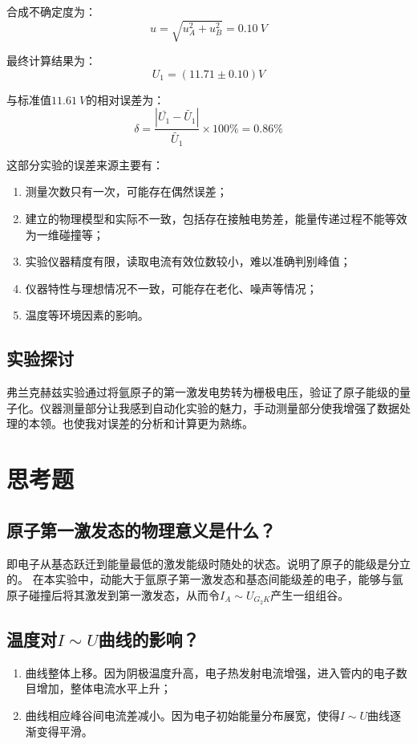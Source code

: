 \documentclass[]{../../templates/Report}%
\begin{document}
\begin{fullreportonly}
合成不确定度为：
\[u = \sqrt{u_A^2 + u_B^2} = \SI{0.10}{V}\]

最终计算结果为：
\[U_1 = (11.71 \pm 0.10)\si{V}\]

与标准值$\SI{11.61}{V}$的相对误差为：
\[\delta = \frac{\left|\bar{U_1} - \tilde{U_1}\right|}{\tilde{U_1}} \times 100 \% = 0.86\%\]

这部分实验的误差来源主要有：
\begin{enumerate}
    \item 测量次数只有一次，可能存在偶然误差；
    \item 建立的物理模型和实际不一致，包括存在接触电势差，能量传递过程不能等效为一维碰撞等；
    \item 实验仪器精度有限，读取电流有效位数较小，难以准确判别峰值；
    \item 仪器特性与理想情况不一致，可能存在老化、噪声等情况；
    \item 温度等环境因素的影响。
\end{enumerate}

\subsection{实验探讨}

弗兰克赫兹实验通过将氩原子的第一激发电势转为栅极电压，验证了原子能级的量子化。仪器测量部分让我感到自动化实验的魅力，手动测量部分使我增强了数据处理的本领。也使我对误差的分析和计算更为熟练。

\section{思考题}
\subsection{原子第一激发态的物理意义是什么？}
即电子从基态跃迁到能量最低的激发能级时随处的状态。说明了原子的能级是分立的。
在本实验中，动能大于氩原子第一激发态和基态间能级差的电子，能够与氩原子碰撞后将其激发到第一激发态，从而令$I_A \sim U_{G_2K}$产生一组组谷。

\subsection{温度对$I \sim U $曲线的影响？}
\begin{enumerate}
    \item 曲线整体上移。因为阴极温度升高，电子热发射电流增强，进入管内的电子数目增加，整体电流水平上升；
    \item 曲线相应峰谷间电流差减小。因为电子初始能量分布展宽，使得$I \sim U$曲线逐渐变得平滑。
\end{enumerate}
\end{fullreportonly}
\insertnotes
\end{document}
